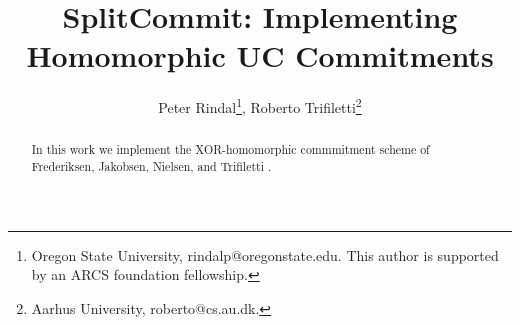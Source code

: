 \documentclass{article}
\begin{document}
	
	\title{SplitCommit: Implementing Homomorphic UC Commitments}
	
	
	\author{
		Peter Rindal\thanks{Oregon State University,  {\sf rindalp@oregonstate.edu}. This author is supported by an ARCS foundation fellowship.}, Roberto  Trifiletti\thanks{Aarhus University, {\sf roberto@cs.au.dk}.}
		}
		
		\maketitle

	
	\begin{abstract}
	In this work we implement the XOR-homomorphic commmitment scheme of Frederiksen, Jakobsen, Nielsen, and Trifiletti \cite{DBLP:conf/tcc/FrederiksenJNT16}.

	\end{abstract}
	
	
	\pagestyle{plain}
	
	
	
	
	
	
	
	
	
	
	
	
	
	
	
	
	
\end{document}
